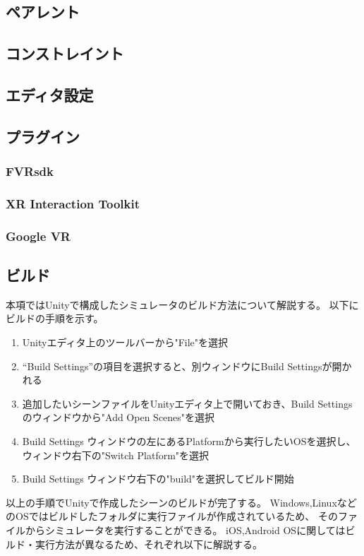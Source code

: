\documentclass{ltjsreport}
\begin{document}
		\subsection{ペアレント}
		\subsection{コンストレイント}
		\subsection{エディタ設定}
		\subsection{プラグイン}
			\subsubsection{FVRsdk}
			\subsubsection{XR Interaction Toolkit}
			\subsubsection{Google VR}
		\subsection{ビルド}
			本項ではUnityで構成したシミュレータのビルド方法について解説する。
			以下にビルドの手順を示す。
			\begin{enumerate}
				\item Unityエディタ上のツールバーから"File"を選択
				\item ``Build Settings''の項目を選択すると、別ウィンドウにBuild Settingsが開かれる
				\item 追加したいシーンファイルをUnityエディタ上で開いておき、Build Settingsのウィンドウから"Add Open Scenes"を選択
				\item Build Settings ウィンドウの左にあるPlatformから実行したいOSを選択し、ウィンドウ右下の"Switch Platform"を選択
				\item Build Settings ウィンドウ右下の"build"を選択してビルド開始
			\end{enumerate}
			以上の手順でUnityで作成したシーンのビルドが完了する。
			Windows,LinuxなどのOSではビルドしたフォルダに実行ファイルが作成されているため、
			そのファイルからシミュレータを実行することができる。
			iOS,Android OSに関してはビルド・実行方法が異なるため、それぞれ以下に解説する。
\end{document}
